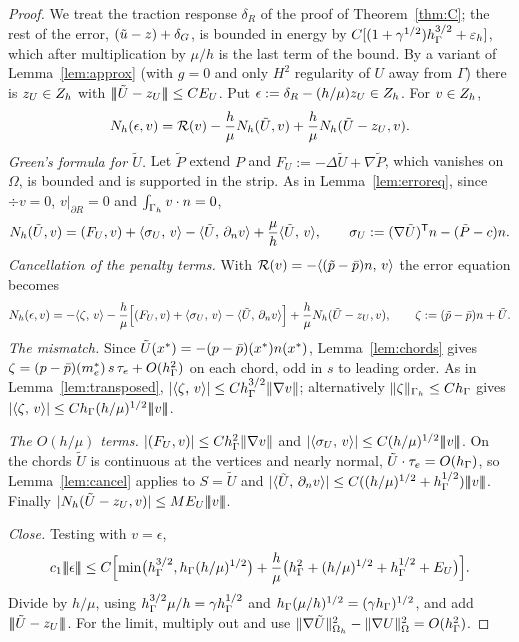 \begin{proof}
We treat the traction response $\delta_R$ of the proof of Theorem~\ref{thm:C}; the rest of the error, $(\tilde u-z)+\delta_G$, is bounded in energy by $C[(1+\gamma^{1/2})h_\Gamma^{3/2}+\varepsilon_h]$, which after multiplication by $\mu/h$ is the last term of the bound. By a variant of Lemma~\ref{lem:approx} (with $g=0$ and only $H^2$ regularity of $U$ away from $\Gamma$) there is $z_U\in Z_h$ with $|\!|\!|\tilde U-z_U|\!|\!|\le CE_U$. Put $\epsilon:=\delta_R-(h/\mu)z_U\in Z_h$. For $v\in Z_h$,
\[
N_h(\epsilon,v)=\mathcal R(v)-\frac h\mu N_h(\tilde U,v)+\frac h\mu N_h(\tilde U-z_U,v).
\]
\emph{Green's formula for $\tilde U$.} Let $\tilde P$ extend $P$ and $F_U:=-\Delta\tilde U+\nabla\tilde P$, which vanishes on $\Omega$, is bounded and is supported in the strip. As in Lemma~\ref{lem:erroreq}, since $\div v=0$, $v|_{\partial R}=0$ and $\int_{\Gamma_h}v\cdot n=0$,
\[
N_h(\tilde U,v)=(F_U,v)+\langle \sigma_U,\, v\rangle-\langle \tilde U,\, \partial_n v\rangle+\frac\mu h\langle \tilde U,\, v\rangle,\qquad\sigma_U:=(\nabla\tilde U)^{\mathsf T}n-(\tilde P-c)n .
\]
\emph{Cancellation of the penalty terms.} With $\mathcal R(v)=-\langle (\tilde p-\bar p)n,\, v\rangle$ the error equation becomes
\[
N_h(\epsilon,v)=-\langle \zeta,\, v\rangle-\frac h\mu\Bigl[(F_U,v)+\langle \sigma_U,\, v\rangle-\langle \tilde U,\, \partial_n v\rangle\Bigr]+\frac h\mu N_h(\tilde U-z_U,v),\qquad\zeta:=(\tilde p-\bar p)n+\tilde U .
\]
\emph{The mismatch.} Since $\tilde U(x^\ast)=-(p-\bar p)(x^\ast)n(x^\ast)$, Lemma~\ref{lem:chords} gives $\zeta=(p-\bar p)(m_e^\ast)\,s\,\tau_e+O(h_\Gamma^2)$ on each chord, odd in $s$ to leading order. As in Lemma~\ref{lem:transposed}, $|\langle \zeta,\, v\rangle|\le Ch_\Gamma^{3/2}\lVert \nabla v\rVert$; alternatively $\lVert \zeta\rVert_{\Gamma_h}\le Ch_\Gamma$ gives $|\langle \zeta,\, v\rangle|\le Ch_\Gamma(h/\mu)^{1/2}|\!|\!|v|\!|\!|$.

\emph{The $O(h/\mu)$ terms.} $|(F_U,v)|\le Ch_\Gamma^2\lVert \nabla v\rVert$ and $|\langle \sigma_U,\, v\rangle|\le C(h/\mu)^{1/2}|\!|\!|v|\!|\!|$. On the chords $\tilde U$ is continuous at the vertices and nearly normal, $\tilde U\cdot\tau_e=O(h_\Gamma)$, so Lemma~\ref{lem:cancel} applies to $S=\tilde U$ and $|\langle \tilde U,\, \partial_n v\rangle|\le C((h/\mu)^{1/2}+h_\Gamma^{1/2})|\!|\!|v|\!|\!|$. Finally $|N_h(\tilde U-z_U,v)|\le ME_U|\!|\!|v|\!|\!|$.

\emph{Close.} Testing with $v=\epsilon$,
\[
c_1|\!|\!|\epsilon|\!|\!|\le C\Bigl[\min\bigl(h_\Gamma^{3/2},h_\Gamma(h/\mu)^{1/2}\bigr)+\frac h\mu\bigl(h_\Gamma^2+(h/\mu)^{1/2}+h_\Gamma^{1/2}+E_U\bigr)\Bigr].
\]
Divide by $h/\mu$, using $h_\Gamma^{3/2}\mu/h=\gamma h_\Gamma^{1/2}$ and $h_\Gamma(\mu/h)^{1/2}=(\gamma h_\Gamma)^{1/2}$, and add $|\!|\!|\tilde U-z_U|\!|\!|$. For the limit, multiply out and use $\lVert \nabla\tilde U\rVert^2_{\Omega_h}-\lVert \nabla U\rVert^2_\Omega=O(h_\Gamma^2)$.
\end{proof}

